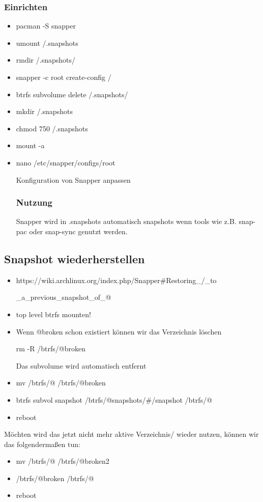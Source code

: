 \documentclass[11pt,a4paper]{article}
\begin{document}
\subsubsection{Einrichten}
\begin{itemize}
\item pacman -S snapper
\item umount /.snapshots
\item rmdir /.snapshots/
\item snapper -c root create-config /
\item btrfs subvolume delete /.snapshots/
\item mkdir /.snapshots
\item chmod 750 /.snapshots
\item mount -a
\item nano /etc/snapper/configs/root

Konfiguration von Snapper anpassen
\subsubsection{Nutzung}
Snapper wird in .snapshots automatisch snapshots wenn tools wie z.B. snap-pac oder snap-sync genutzt werden.
\end{itemize}

\subsection{Snapshot wiederherstellen}
\begin{itemize}
\item https://wiki.archlinux.org/index.php/Snapper\#Restoring\_/\_to

\_a\_previous\_snapshot\_of\_@
\item top level btrfs mounten!
\item Wenn @broken schon existiert können wir das Verzeichnis löschen

rm -R /btrfs/@broken

Das subvolume wird automatisch entfernt
\item mv /btrfs/@ /btrfs/@broken
\item btrfs subvol snapshot /btrfs/@snapshots/\#/snapshot /btrfs/@
\item reboot
\end{itemize}
Möchten wird das jetzt nicht mehr aktive \glqq{}Verzeichnis\grqq/{} wieder nutzen, können wir das folgendermaßen tun:
\begin{itemize}
\item mv /btrfs/@ /btrfs/@broken2
\item /btrfs/@broken /btrfs/@
\item reboot
\end{itemize}
\end{document}
